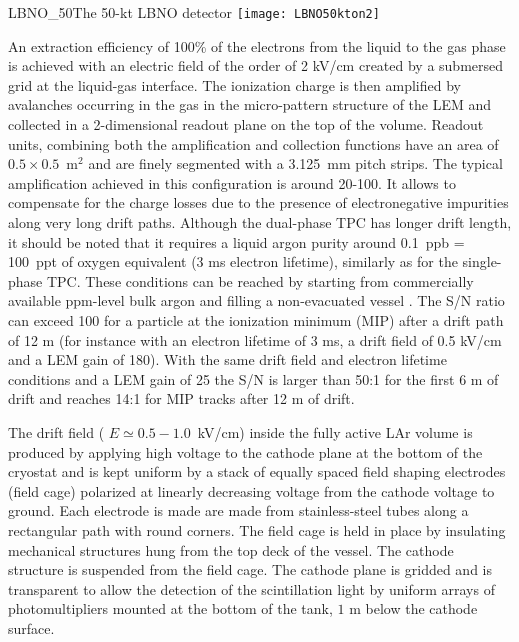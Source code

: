 \begin{cdrfigure}{LBNO_50}{The 50-kt LBNO detector}
\texttt{[image: LBNO50kton2]}
\end{cdrfigure}

An extraction efficiency of  100\% of the electrons from the liquid to the gas phase is achieved with an electric field of the order of 2 kV/cm created by a submersed grid at the liquid-gas interface. The ionization charge is then amplified by avalanches occurring in the gas in the micro-pattern structure of the LEM and collected in a 2-dimensional readout plane on the top of the volume. Readout units, combining both the amplification and collection functions have an area of $0.5\times 0.5$~m$^2$ and are finely segmented with a 3.125~mm pitch strips. The typical amplification achieved in this configuration is around 20-100. It allows to compensate for the charge losses due to the presence of electronegative impurities along very long drift paths. Although the dual-phase TPC has longer drift length, it should be noted that it requires a liquid argon purity around 0.1~ppb = 100~ppt of oxygen equivalent (3 ms electron lifetime), similarly as for the single-phase TPC. These conditions can be reached by starting from commercially available ppm-level bulk argon and filling a non-evacuated vessel \cite{WA105_TDR}. The S/N ratio can exceed 100 for a particle at the ionization minimum (MIP) after a drift path of 12 m (for instance with an electron lifetime of 3 ms, a drift field of 0.5 kV/cm and a LEM gain of 180). With the same drift field and electron lifetime conditions and a LEM gain of 25 the S/N is larger than 50:1 for the first 6 m of drift and reaches 14:1  for MIP tracks after 12 m of drift.

The drift field ( $E{\simeq} 0.5-1.0$~kV/cm) inside the fully active LAr volume  is  produced by applying high voltage  to the cathode plane at the bottom of the cryostat and is kept uniform by a stack of equally spaced field shaping electrodes (field cage) polarized at linearly decreasing voltage from the cathode voltage to ground. Each electrode is made are  made from stainless-steel tubes along a rectangular path with round corners. The field cage is held in place by insulating mechanical structures hung from the top deck of the vessel.  The cathode structure is suspended from the field cage. The cathode plane is gridded and is transparent to allow the detection of the scintillation light by uniform arrays of photomultipliers mounted at the bottom of the tank, $1$ m  below the cathode surface. 


